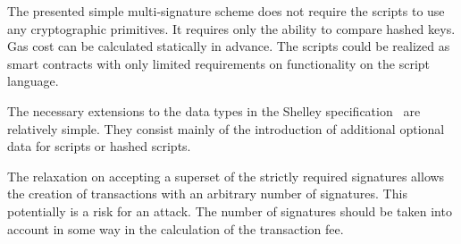 \documentclass[11pt,a4paper,dvipsnames]{article}
\theoremstyle{definition}
\begin{document}
The presented simple multi-signature scheme does not require the scripts to use
any cryptographic primitives. It requires only the ability to compare hashed
keys. Gas cost can be calculated statically in advance. The scripts could be
realized as smart contracts with only limited requirements on functionality on
the script language.

The necessary extensions to the data types in the Shelley
specification~\cite{shelley_formal_spec} are relatively simple. They consist
mainly of the introduction of additional optional data for scripts or hashed
scripts.

The relaxation on accepting a superset of the strictly required signatures
allows the creation of transactions with an arbitrary number of signatures. This
potentially is a risk for an attack. The number of signatures should be taken
into account in some way in the calculation of the transaction fee.


\end{document}
